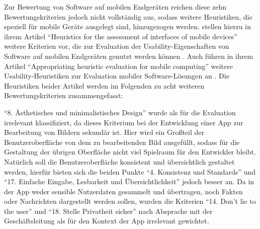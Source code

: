 \noindent
Zur Bewertung von Software auf mobilen Endgeräten reichen diese zehn Bewertungskriterien jedoch nicht vollständig aus, sodass weitere Heuristiken, die speziell für mobile Geräte ausgelegt sind, hinzugezogen werden.
\citeauthor{MachadoNeto13} stellen hierzu in ihrem Artikel ``Heuristics for the assessment of interfaces of mobile devices'' weitere Kriterien vor, die zur Evaluation der Usability-Eigenschaften von Software auf mobilen Endgeräten genutzt werden können \citep[Seite 95]{MachadoNeto13}.
Auch \citeauthor{Bertini09} führen in ihrem Artikel ``Appropriating heuristic evaluation for mobile computing'' weitere Usability-Heuristiken zur Evaluation mobiler Software-Lösungen an \citep[Seite 20--41]{Bertini09}.
Die Heuristiken beider Artikel werden im Folgenden zu acht weiteren Bewertungskriterien zusammengefasst:

\begin{enumerate}
    \setcounter{enumi}{10}
\end{enumerate}

\noindent
``8. Ästhetisches und minimalistisches Design'' wurde als für die Evaluation irrelevant klassifiziert, da dieses Kriterium bei der Entwicklung einer App zur Bearbeitung von Bildern sekundär ist.
Hier wird ein Großteil der Benutzeroberfläche von dem zu bearbeitenden Bild ausgefüllt, sodass für die Gestaltung der übrigen Oberfläche nicht viel Spielraum für den Entwickler bleibt.
Natürlich soll die Benutzeroberfläche konsistent und übersichtlich gestaltet werden, hierfür bieten sich die beiden Punkte ``4. Konsistenz und Standards'' und ``17. Einfache Eingabe, Lesbarkeit und Übersichtlichkeit'' jedoch besser an.
Da in der App weder sensible Nutzerdaten gesammelt und übertragen, noch Fakten oder Nachrichten dargestellt werden sollen, wurden die Kriterien ``14. Don't lie to the user'' und ``18. Stelle Privatheit sicher'' nach Absprache mit der Geschäftsleitung als für den Kontext der App irrelevant gewichtet.

